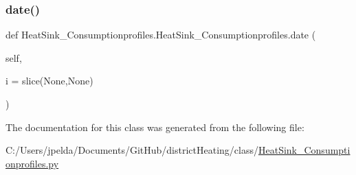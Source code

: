 \mbox{\label{class_heat_sink___consumptionprofiles_1_1_heat_sink___consumptionprofiles_a5e52056f8f430a2aa642948af5246a2f}} 
\subsubsection{\texorpdfstring{date()}{date()}}
{\footnotesize\ttfamily def Heat\+Sink\+\_\+\+Consumptionprofiles.\+Heat\+Sink\+\_\+\+Consumptionprofiles.\+date (\begin{DoxyParamCaption}\item[{}]{self,  }\item[{}]{i = {\ttfamily slice(None,None)} }\end{DoxyParamCaption})}



The documentation for this class was generated from the following file\+:\begin{DoxyCompactItemize}
\item 
C\+:/\+Users/jpelda/\+Documents/\+Git\+Hub/district\+Heating/class/\hyperlink{_heat_sink___consumptionprofiles_8py}{Heat\+Sink\+\_\+\+Consumptionprofiles.\+py}\end{DoxyCompactItemize}
